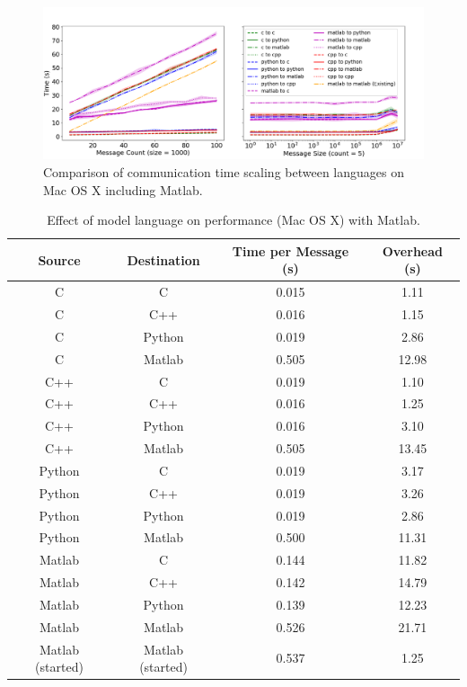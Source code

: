 \documentclass[journal]{IEEEtran}
\begin{document}
%
\ifinclfig
 	\begin{figure}[htbp]
	\begin{center}
	\includegraphics[width=\columnwidth,keepaspectratio]{./images/scaling_language_matlab.png}
	\caption{Comparison of communication time scaling between languages on Mac OS X including Matlab.}
	\label{fig:language_matlab}
	\end{center}
	\end{figure}
\fi
%
\begin{table}[htbp]
\begin{center}
\begin{tabular}{|c|c|c|c|}
\hline
Source 	& Destination 	& Time per Message (s) 	& Overhead (s) 	\\\hline
C 				& C					& 0.015				& 1.11			\\
C 				& C++				& 0.016				& 1.15			\\
C 				& Python				& 0.019				& 2.86			\\
C				& Matlab				& 0.505				& 12.98			\\
\hline%
C++ 				& C					& 0.019				& 1.10			\\
C++ 				& C++				& 0.016				& 1.25			\\
C++ 				& Python				& 0.016				& 3.10			\\
C++ 				& Matlab				& 0.505				& 13.45			\\
\hline%
Python			& C					& 0.019				& 3.17			\\
Python			& C++				& 0.019				& 3.26			\\
Python			& Python				& 0.019				& 2.86			\\
Python			& Matlab				& 0.500				& 11.31			\\
\hline%
Matlab			& C					& 0.144				& 11.82			\\
Matlab			& C++				& 0.142				& 14.79			\\
Matlab			& Python				& 0.139				& 12.23			\\
Matlab			& Matlab				& 0.526				& 21.71			\\
\hline%
Matlab (started)		& Matlab (started)		& 0.537				& 1.25			\\
\hline
\end{tabular}
\end{center}
\caption{Effect of model language on performance (Mac OS X) with Matlab.}
\label{tab:language_matlab}
\end{table}%
%
\end{document}
